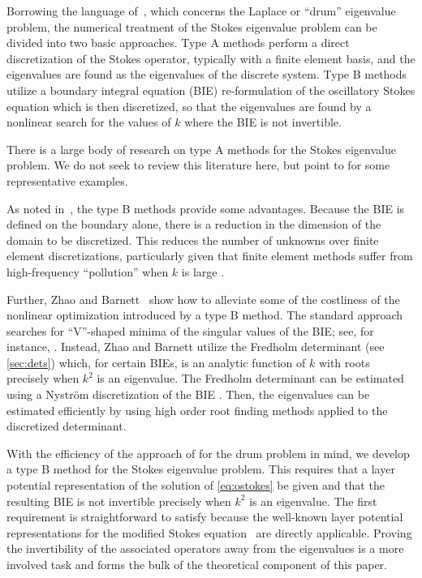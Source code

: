 Borrowing the language of~\cite{zhao2015robust},
which concerns the Laplace or ``drum'' eigenvalue
problem,
the numerical treatment of the Stokes eigenvalue
problem can be divided into two basic approaches.
%
Type A
methods perform a direct discretization of the
Stokes operator, typically with a
finite element basis, and the eigenvalues are found
as the eigenvalues of the discrete system.
%
Type B
methods utilize a boundary integral equation
(BIE) re-formulation of the oscillatory Stokes
equation which is then discretized, so that
the eigenvalues are found by a nonlinear search
for the values of $k$ where the BIE is not invertible.
%

There is a large body of research on type A methods
for the Stokes eigenvalue problem.
%
We do not seek to review this literature here,
but point to \cite{johnson1974beam,
  rannacher1979nonconforming,
  mercier1981eigenvalue,bjorstad1999high,
  jia2009approximation,chen2006approximation,
  lovadina2009posteriori,huang2011numerical,
  carstensen2014guaranteed}
for some representative examples.


As noted in~\cite{zhao2015robust}, the type B
methods provide some advantages.
%
Because the BIE is defined on the
boundary alone, there is a reduction in the
dimension of the domain to be discretized.
%
This reduces the number of unknowns over finite
element discretizations, particularly given
that finite element methods suffer from
high-frequency ``pollution'' when $k$ is large
\cite{babuska1997pollution}.

Further, Zhao and Barnett~\cite{zhao2015robust}
show how to alleviate some of the costliness of the
nonlinear optimization introduced by a type B method.
%
The standard approach searches for ``V''-shaped minima
of the singular values of the BIE; see, for
instance, \cite{trefethen2006computed}.
%
Instead, Zhao and Barnett utilize the Fredholm
determinant (see \cref{sec:dets}) which, for certain
BIEs, is an analytic function of $k$ with roots
precisely when $k^2$ is an eigenvalue.
%
The Fredholm determinant can be estimated using
a Nystr\"{o}m discretization of the BIE
\cite{bornemann2010numerical,zhao2015robust}.
%
Then, the eigenvalues can be estimated efficiently
by using high order root finding methods applied
to the discretized determinant.

With the efficiency of the approach of
\cite{zhao2015robust} for the drum problem in mind,
we develop a type B method for the Stokes eigenvalue
problem.
%
This requires that a layer
potential representation of the solution
of \cref{eq:ostokes} be given and that the resulting BIE
is not invertible precisely when $k^2$ is an eigenvalue.
%
The first requirement is straightforward to
satisfy because the
well-known layer potential representations for the
modified Stokes equation~\cite{Pozrikidis1992,biros2002embedded,
  jiang2013second,ladyzhenskaya1969mathematical}
are directly applicable.
%
Proving the invertibility of the associated operators
away from the eigenvalues is a more involved task
and forms the bulk of the theoretical component
of this paper.

